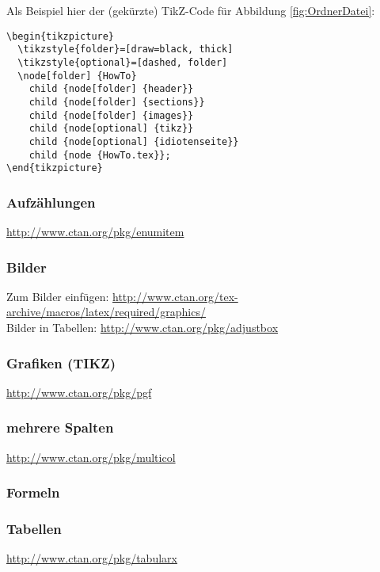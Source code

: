 Als Beispiel hier der (gekürzte) TikZ-Code für Abbildung \ref{fig:OrdnerDatei}:
\begin{lstlisting}
\begin{tikzpicture}
  \tikzstyle{folder}=[draw=black, thick]
  \tikzstyle{optional}=[dashed, folder]
  \node[folder] {HowTo}
    child {node[folder] {header}}
    child {node[folder] {sections}}
    child {node[folder] {images}}
    child {node[optional] {tikz}}
    child {node[optional] {idiotenseite}}
    child {node {HowTo.tex}};
\end{tikzpicture}
\end{lstlisting}


\subsubsection{Aufzählungen}
\url{http://www.ctan.org/pkg/enumitem}

\subsubsection{Bilder}
Zum Bilder einfügen: \url{http://www.ctan.org/tex-archive/macros/latex/required/graphics/} \\
Bilder in Tabellen: \url{http://www.ctan.org/pkg/adjustbox}

\subsubsection{Grafiken (TIKZ)}
\url{http://www.ctan.org/pkg/pgf}

\subsubsection{mehrere Spalten}
\url{http://www.ctan.org/pkg/multicol}


\subsubsection{Formeln}
\subsubsection{Tabellen}
\url{http://www.ctan.org/pkg/tabularx}
